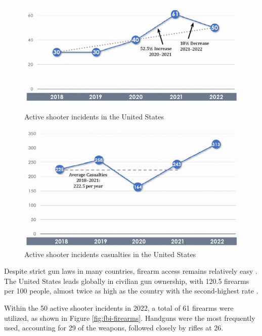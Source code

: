 \begin{figure}[h]
    \centering
    \begin{minipage}{0.49\textwidth}
        \centering
        \includegraphics[width=1\linewidth]{figs/incidents.png}
        \caption{Active shooter incidents in the United States \cite{rfc37}}
        \label{fig:incidents}
    \end{minipage}\hfill
    \begin{minipage}{0.42\textwidth}
        \centering
        \includegraphics[width=1\linewidth]{figs/casualties.png}
        \caption{Active shooter incidents casualties in the United States \cite{rfc37}}
        \label{fig:casualties}
    \end{minipage}
\end{figure}

Despite strict gun laws in many countries, firearm access remains relatively easy \cite{rfc39, rfc40}. The United States leads globally in civilian gun ownership, with 120.5 firearms per 100 people, almost twice as high as the country with the second-highest rate \cite{rfc32}.

Within the 50 active shooter incidents in 2022, a total of 61 firearms were utilized, as shown in Figure \ref{fig:fbi-firearms}. Handguns were the most frequently used, accounting for 29 of the weapons, followed closely by rifles at 26.

